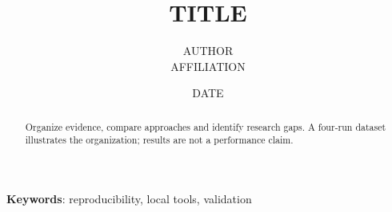 \documentclass{article}
\title{{{TITLE}}}
\author{{{AUTHOR}} \\ {{AFFILIATION}}}
\date{{{DATE}}}
\begin{document}
\maketitle
\begin{abstract}Organize evidence, compare approaches and identify research gaps. A four-run dataset illustrates the organization; results are not a performance claim.\end{abstract}
\textbf{Keywords}: reproducibility, local tools, validation





\end{document}
